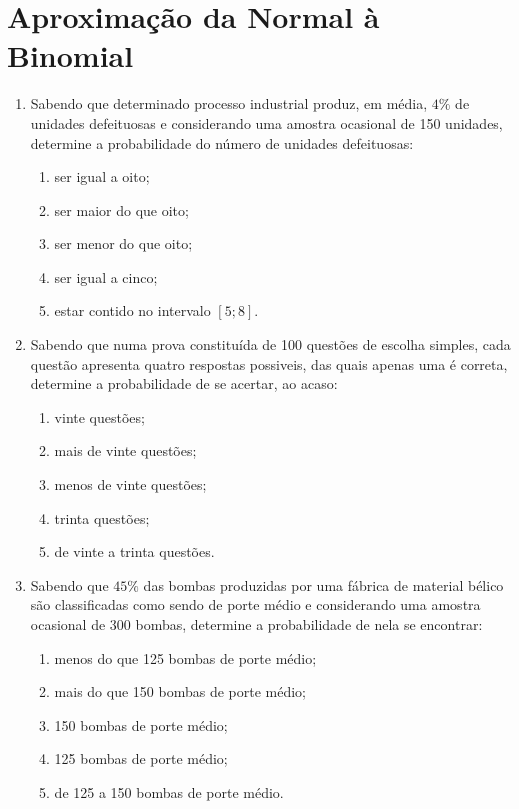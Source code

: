 \chapter{Aproximação da Normal à Binomial}

\begin{enumerate}[resume]

\item Sabendo que determinado processo industrial produz, em média, $4\%$ de unidades defeituosas e considerando uma amostra ocasional de 150 unidades, determine a probabilidade do número de unidades defeituosas:
	\begin{enumerate}
	\item ser igual a oito;
	\item ser maior do que oito;
	\item	 ser menor do que oito;
	\item ser igual a cinco;
	\item estar contido no intervalo $[5 ; 8]$.
	\end{enumerate}

\item Sabendo que numa prova constituída de 100 questões de escolha simples, cada questão apresenta quatro respostas possiveis, das quais apenas uma é correta, determine a probabilidade de se acertar, ao acaso:
	\begin{enumerate}
	\item vinte questões;
	\item mais de vinte questões;
	\item	 menos de vinte questões;
	\item trinta questões;
	\item de vinte a trinta questões.
	\end{enumerate}

\item Sabendo que $45\%$ das bombas produzidas por uma fábrica de material bélico são classificadas como sendo de porte médio e considerando uma amostra ocasional de 300 bombas, determine a probabilidade de nela se encontrar:
	\begin{enumerate}
	\item menos do que 125 bombas de porte médio;
	\item mais do que 150 bombas de porte médio;
	\item	 150 bombas de porte médio;
	\item 125 bombas de porte médio;
	\item de 125 a 150 bombas de porte médio.
	\end{enumerate}
\end{enumerate}